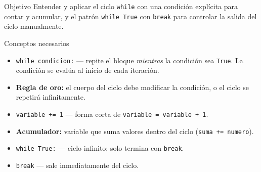 \documentclass[12pt,a4paper]{article}
\begin{document}
\begin{objetivobox}{Objetivo}
Entender y aplicar el ciclo \texttt{while} con una condición explícita
para contar y acumular, y el patrón \texttt{while True} con \texttt{break}
para controlar la salida del ciclo manualmente.
\end{objetivobox}

\vspace{0.6em}
\begin{conceptobox}{Conceptos necesarios}
\begin{itemize}
  \item \texttt{while condicion:} — repite el bloque \emph{mientras} la
        condición sea \texttt{True}.  La condición se evalúa al inicio
        de cada iteración.
  \item \textbf{Regla de oro:} el cuerpo del ciclo debe modificar la condición,
        o el ciclo se repetirá infinitamente.
  \item \texttt{variable += 1} — forma corta de \texttt{variable = variable + 1}.
  \item \textbf{Acumulador:} variable que suma valores dentro del ciclo
        (\texttt{suma += numero}).
  \item \texttt{while True:} — ciclo infinito; solo termina con \texttt{break}.
  \item \texttt{break} — sale inmediatamente del ciclo.
\end{itemize}
\end{conceptobox}
\end{document}

